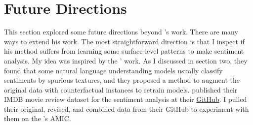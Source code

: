 \documentclass[aoas]{imsart}
\numberwithin{equation}{section}
\theoremstyle{plain}
\theoremstyle{remark}
\begin{document}
\section{Future Directions}
This section explored some future directions beyond \cite{chenyu}'s work. There are many ways to extend his work. The most straightforward direction is that I inspect if his method suffers from learning some surface-level patterns to make sentiment analysis. My idea was inspired by the \cite{DBLP:journals/corr/abs-1909-12434}' work. As I discussed in section two, they found that some natural language understanding models usually classify sentiments by spurious textures, and they proposed a method to augment the original data with counterfactual instances to retrain models. \cite{DBLP:journals/corr/abs-1909-12434} published their IMDB movie review dataset for the sentiment analysis at their \href{https://github.com/acmi-lab/counterfactually-augmented-data/tree/master}{GitHub}. I pulled their original, revised, and combined data from their GitHub to experiment with them on the \cite{chenyu}'s AMIC. 
\end{document}
